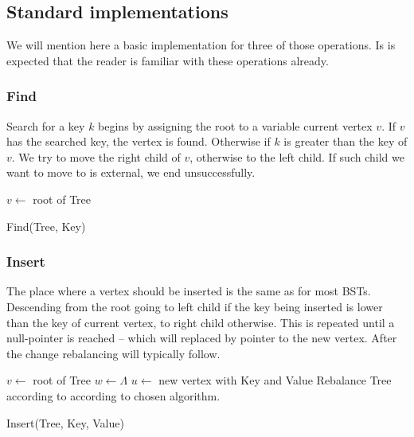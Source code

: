 \subsection{Standard implementations}

We will mention here a basic implementation for three of those operations. Is is expected that the reader is familiar with these operations already.

\subsubsection*{Find}
Search for a key $k$ begins by assigning the root to a variable current vertex $v$. If $v$ has the searched key, the vertex is found. Otherwise if $k$ is greater than the key of $v$. We try to move the right child of $v$, otherwise to the left child. If such child we want to move to is external, we end unsuccessfully. 


\begin{algorithm}
	\small
	\SetAlgoLined
	$v \gets $ root of Tree\;
	\caption{Find(Tree, Key)}
\end{algorithm}


\subsubsection*{Insert}
The place where a vertex should be inserted is the same as for most BSTs. Descending from the root going to left child if the key being inserted is lower than the key of current vertex, to right child otherwise. This is repeated until a null-pointer is reached -- which will replaced by pointer to the new vertex. After the change rebalancing will typically follow.


\begin{algorithm}
	\small
	\SetAlgoLined
	$v \gets $ root of Tree\;
	$w \gets \Lambda$\;
	$u \gets $ new vertex with Key and Value\;
	Rebalance Tree according to according to chosen algorithm.
	\caption{Insert(Tree, Key, Value)}
\end{algorithm}

